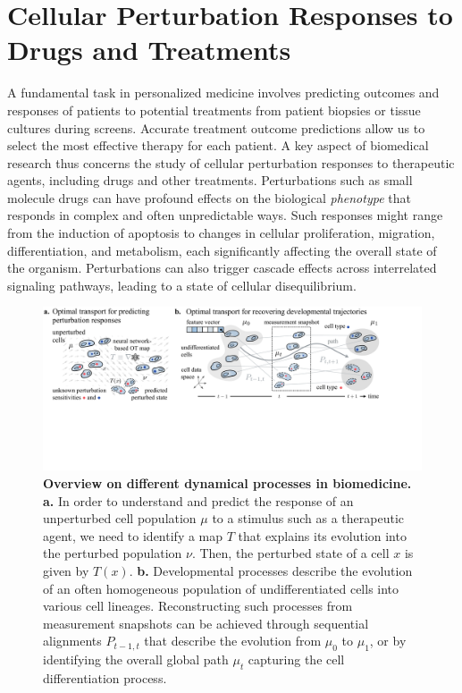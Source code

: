 \section{Cellular Perturbation Responses to Drugs and Treatments}
\label{sec:cell_perturbation_responses}

A fundamental task in personalized medicine involves predicting outcomes and responses of patients to potential treatments from patient biopsies or tissue cultures during screens. Accurate treatment outcome predictions allow us to select the most effective therapy for each patient.
A key aspect of biomedical research thus concerns the study of cellular perturbation responses to therapeutic agents, including drugs and other treatments.
Perturbations such as small molecule drugs can have profound effects on the biological \emph{phenotype} that responds in complex and often unpredictable ways.
Such responses might range from the induction of apoptosis to changes in cellular proliferation, migration, differentiation, and metabolism, each significantly affecting the overall state of the organism. 
Perturbations can also trigger cascade effects across interrelated signaling pathways, leading to a state of cellular disequilibrium.

\begin{figure}[t]
  \includegraphics[width=\textwidth]{figures/fig_bio_problems.pdf}
  \caption{\textbf{Overview on different dynamical processes in biomedicine.} \textbf{a.} In order to understand and predict the response of an unperturbed cell population $\mu$ to a stimulus such as a therapeutic agent, we need to identify a map $T$ that explains its evolution into the perturbed population $\nu$. Then, the perturbed state of a cell $x$ is given by $T(x)$.  \textbf{b.} Developmental processes describe the evolution of an often homogeneous population of undifferentiated cells into various cell lineages. Reconstructing such processes from measurement snapshots can be achieved through sequential alignments $P_{t-1,t}$ that describe the evolution from $\mu_0$ to $\mu_1$, or by identifying the overall global path $\mu_t$ capturing the cell differentiation process.}
  \label{fig:bio_problems}
\end{figure}

